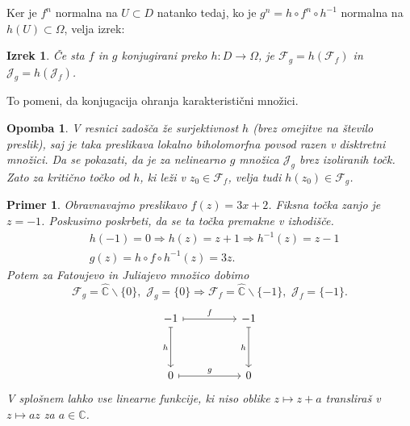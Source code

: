\documentclass{article}
\newtheorem{opomba}{Opomba}
\newtheorem{primer}{Primer}
\newtheorem{izrek}{Izrek}
\newcommand{\C}{\mathbb{C}}
\newcommand{\F}{\mathcal{F}}
\begin{document}
Ker je $f^n$ normalna na $U \subset D$ natanko tedaj, ko je 
$g^n = h\circ f^n \circ h^{-1}$ normalna na $h(U) \subset \Omega$, 
velja izrek:

\begin{izrek}
Če sta $f$ in $g$ konjugirani preko $h: D \rightarrow \Omega$, je 
$\F_g = h(\F_f)$ in $\mathcal{J}_g = h(\mathcal{J}_f)$.
\end{izrek}
To pomeni, da konjugacija ohranja karakteristični množici.

\begin{opomba}
V resnici zadošča že surjektivnost $h$ (brez omejitve na število preslik),
saj je taka preslikava lokalno biholomorfna povsod razen v disktretni 
množici. Da se pokazati, da je za nelinearno $g$ množica $\mathcal{J}_g$ 
brez izoliranih točk. Zato za kritično točko od $h$, ki leži v $z_0 \in \F_f$, 
velja tudi $h(z_0) \in \F_g$.
\end{opomba}


\begin{primer}
    Obravnavajmo preslikavo $f(z) = 3x + 2$. Fiksna točka zanjo je $z = -1$.
    Poskusimo poskrbeti, da se ta točka premakne v izhodišče.
    \begin{align*}
    &h(-1) = 0 \Longrightarrow h(z) = z + 1 \Longrightarrow h^{-1}(z) = z - 1\\
    &g(z) = h\circ f\circ h^{-1}(z) = 3z.
    \end{align*}
    Potem za Fatoujevo in Juliajevo množico dobimo 
    $$
    \F_g = \hat{\C}\backslash \{0\},\,\, \mathcal{J}_g = \{0\} \Longrightarrow 
    \F_f = \hat{\C}\backslash \{-1\},\,\, \mathcal{J}_f = \{-1\}.
    $$
    \[\begin{tikzcd}
	{-1} && {-1} \\
	\\
	0 && 0
	\arrow["f", maps to, from=1-1, to=1-3]
	\arrow["h"', maps to, from=1-1, to=3-1]
	\arrow["h"', maps to, from=1-3, to=3-3]
	\arrow["g", maps to, from=3-1, to=3-3]
\end{tikzcd}\]
\noindent
V splošnem lahko vse linearne funkcije, ki niso oblike $z \mapsto z + a$ 
transliraš v $z \mapsto a z$ za $a\in \C$.
\end{primer}
    
\end{document}
